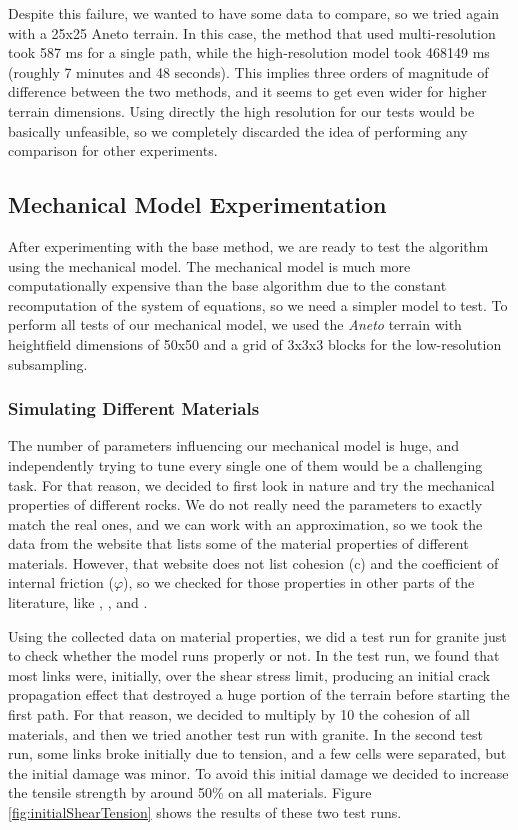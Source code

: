 \vspace{10pt}

Despite this failure, we wanted to have some data to compare, so we tried 
again with a 25x25 Aneto terrain. In this case, the method that used 
multi-resolution took 587 ms for a single path, while the high-resolution 
model took 468149 ms (roughly 7 minutes and 48 seconds). This implies 
three orders of magnitude of difference between the two methods, and 
it seems to get even wider for higher terrain dimensions.
Using directly the high resolution for our tests would be basically 
unfeasible, so we completely discarded the idea of performing 
any comparison for other experiments.


\subsection{Mechanical Model Experimentation}
After experimenting with the base method, we are ready to test 
the algorithm using the mechanical model. The mechanical model is 
much more computationally expensive than the base algorithm due to the 
constant recomputation of the system of equations, so we need a simpler 
model to test. To perform all tests of our mechanical model, we used the \textit{Aneto} terrain with heightfield dimensions of
50x50 and a grid of 3x3x3 blocks for the low-resolution subsampling.

\subsubsection{Simulating Different Materials}

The number of parameters influencing our mechanical model is huge, and 
independently trying to tune every single one of them would be a challenging 
task. For that reason, we decided to first look in nature and try the 
mechanical properties of different rocks. We do not really need 
the parameters to exactly match the real ones, and we can work with 
an approximation, so we took the data from the website \cite{MakeitFrom} 
that lists some of the material properties of different materials. However,
that website does not list cohesion (c) and the coefficient of internal 
friction ($\varphi$), so we checked for those properties in other 
parts of the literature, like \cite{article}, \cite{article2}, and \cite{app15137481}.

\vspace{10pt}

Using the collected data on material properties, we did a test run for granite
just to check whether the model runs properly or not. In the test run,
we found that most links were, initially, over the shear stress limit, 
producing an initial crack propagation effect that destroyed a huge portion
of the terrain before starting the first path. For that reason, we decided 
to multiply by 10 the cohesion of all materials, and then we tried another test run 
with granite. In the second test run, some links broke initially due to 
tension, and a few cells were separated, but the initial damage was minor.
To avoid this initial damage we decided to increase the tensile strength 
by around 50\% on all materials. Figure \ref{fig:initialShearTension} shows 
the results of these two test runs.

